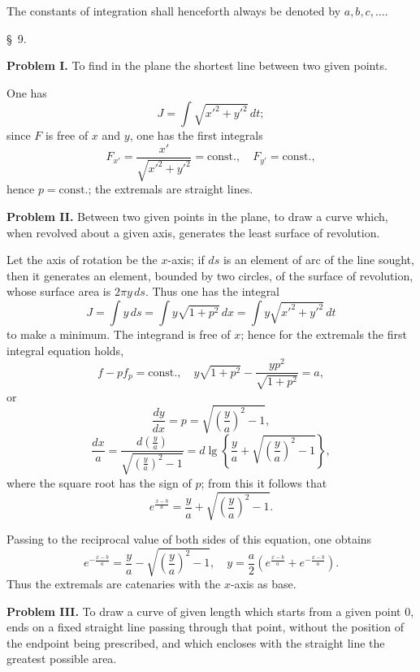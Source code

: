 \documentclass[11pt,a4paper,leqno]{article}
\providecommand{\lg}{\operatorname{lg}}
\begin{document}
The constants of integration shall henceforth always be denoted by $a,b,c,\ldots$.

\begin{center}{\large \S~9.}\end{center}

\noindent\textbf{Problem I.} To find in the plane the shortest line between two given points.

One has
\[
J=\int \sqrt{x'^2+y'^2}\,dt;
\]
since $F$ is free of $x$ and $y$, one has the first integrals
\[
F_{x'}=\frac{x'}{\sqrt{x'^2+y'^2}}=\mathrm{const.},\quad F_{y'}=\mathrm{const.},
\]
hence $p=\mathrm{const.}$; the extremals are straight lines.

\medskip
\noindent\textbf{Problem II.} Between two given points in the plane, to draw a curve which, when revolved about a given axis, generates the least surface of revolution.

Let the axis of rotation be the $x$-axis; if $ds$ is an element of arc of the line sought, then it generates an element, bounded by two circles, of the surface of revolution, whose surface area is $2\pi y\,ds$. Thus one has the integral
\[
J=\int y\,ds=\int y\sqrt{1+p^2}\,dx=\int y\sqrt{x'^2+y'^2}\,dt
\]
to make a minimum. The integrand is free of $x$; hence for the extremals the first integral equation holds,
\[
f-pf_p=\mathrm{const.},\quad y\sqrt{1+p^2}-\frac{yp^2}{\sqrt{1+p^2}}=a,
\]
or
\[
\frac{dy}{dx}=p=\sqrt{\left(\frac{y}{a}\right)^2-1},
\]
\[
\frac{dx}{a}=\frac{d\left(\frac{y}{a}\right)}{\sqrt{\left(\frac{y}{a}\right)^2-1}}=d\lg\left\{\frac{y}{a}+\sqrt{\left(\frac{y}{a}\right)^2-1}\right\},
\]
where the square root has the sign of $p$; from this it follows that
\[
e^{\frac{x-b}{a}}=\frac{y}{a}+\sqrt{\left(\frac{y}{a}\right)^2-1}.
\]

Passing to the reciprocal value of both sides of this equation, one obtains
\[
e^{-\frac{x-b}{a}}=\frac{y}{a}-\sqrt{\left(\frac{y}{a}\right)^2-1},\quad
y=\frac{a}{2}\left(e^{\frac{x-b}{a}}+e^{-\frac{x-b}{a}}\right).
\]
Thus the extremals are catenaries with the $x$-axis as base.

\medskip
\noindent\textbf{Problem III.} To draw a curve of given length which starts from a given point 0, ends on a fixed straight line passing through that point, without the position of the endpoint being prescribed, and which encloses with the straight line the greatest possible area.
\end{document}
